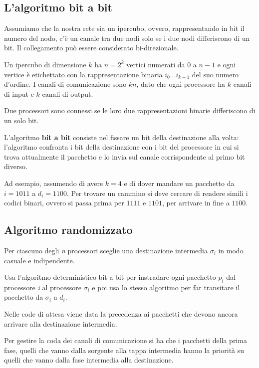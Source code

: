 
\subsection{L'algoritmo bit a bit}

Assumiamo che la nostra rete sia un ipercubo, ovvero, rappresentando in bit il numero del nodo, c'è un canale tra due nodi solo se i due nodi differiscono di un bit. Il collegamento può essere considerato bi-direzionale.

Un ipercubo di dimensione $k$ ha $n=2^k$ vertici numerati da 0 a $n-1$ e ogni vertice è etichettato con la rappresentazione binaria $i_0 \ldots i_{k-1}$ del suo numero d'ordine.
I canali di comunicazione sono $kn$, dato che ogni processore ha $k$ canali di input e $k$ canali di output.

Due processori sono connessi se le loro due rappresentazioni binarie differiscono di un solo bit.

L'algoritmo \textbf{bit a bit} consiste nel fissare un bit della destinazione alla volta: l'algoritmo confronta i bit della destinazione con i bit del processore in cui si trova attualmente il pacchetto e lo invia sul canale corrispondente al primo bit diverso.

Ad esempio, assumendo di avere $k=4$ e di dover mandare un pacchetto da $i = 1011$ a $d_i = 1100$. Per trovare un cammino si deve cercare di rendere simili i codici binari, ovvero si passa prima per $1111$ e $1101$, per arrivare in fine a $1100$.

\subsection{Algoritmo randomizzato}\label{una-prima-versione-dellalgoritmo-randomizzato}

Per ciascuno degli \emph{n} processori sceglie una destinazione intermedia $\sigma_i$ in modo casuale e indipendente.

Usa l'algoritmo deterministico bit a bit per instradare ogni pacchetto $p_i$ dal processore \emph{i} al processore $\sigma_i$ e poi usa lo
stesso algoritmo per far transitare il pacchetto da $\sigma_i$ a $d_i$.

Nelle code di attesa viene data la precedenza ai pacchetti che devono ancora arrivare alla destinazione intermedia.

Per gestire la coda dei canali di comunicazione si ha che i pacchetti della prima fase, quelli che vanno dalla sorgente alla tappa intermedia hanno la priorità su quelli che vanno dalla fase intermedia alla destinazione.

